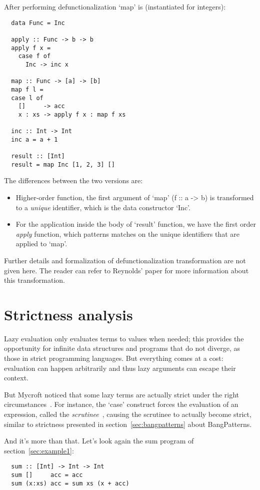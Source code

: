 \documentclass[diploma]{softlab-thesis}
\begin{document}
After performing defunctionalization `map' is (instantiated for integers):
\begin{verbatim}
  data Func = Inc 

  apply :: Func -> b -> b
  apply f x =
    case f of
      Inc -> inc x

  map :: Func -> [a] -> [b]
  map f l =
  case l of
    []     -> acc
    x : xs -> apply f x : map f xs

  inc :: Int -> Int 
  inc a = a + 1

  result :: [Int]
  result = map Inc [1, 2, 3] []
\end{verbatim}

The differences between the two versions are:
\begin{itemize}
  \item Higher-order function, the first argument of `map' (f :: a -> b) is 
  transformed to a \textit{unique} identifier, which is the data constructor `Inc'.
  \item For the application inside the body of `result' function, we have the first order \textit{apply}
  function, which patterns matches on the unique identifiers that are applied to `map'.
\end{itemize}

Further details and formalization of defunctionalization transformation are not given here. 
The reader can refer to Reynolds' paper for more information about this transformation.

\section {Strictness analysis}
\label{sec:strictness-analysis}

Lazy evaluation only evaluates terms to values when needed; this provides the 
opportunity for infinite data structures and programs that do not diverge, as those in 
strict programming languages. But everything comes at a cost: evaluation can happen 
arbitrarily and thus lazy arguments can escape their context.

But Mycroft
noticed that some lazy terms are actually strict under the right circumstances~\cite{Mycroft:1980:TPT:647324.721526}. For instance, the `case' 
construct forces the evaluation of an expression, called the \emph{scrutinee}~\cite{PeytonJones94}, causing the scrutinee to actually become strict, 
similar to strictness presented in section~\ref{sec:bangpatterns} about BangPatterns. 

And it's more than that. Let's look again the sum program of section~\ref{sec:example1}:
\begin{verbatim}
  sum :: [Int] -> Int -> Int
  sum []     acc = acc
  sum (x:xs) acc = sum xs (x + acc)
\end{verbatim}
\end{document}
